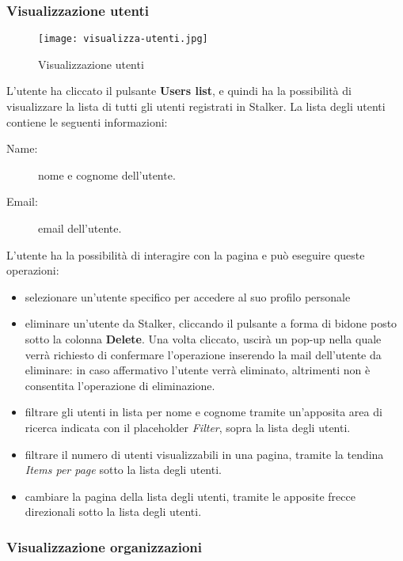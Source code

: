\documentclass[../manuale-utente.tex]{subfiles}
\begin{document}
\subsubsection{Visualizzazione utenti}%
\label{subs:visualizzazione_utenti}

\begin{figure}[H]
    \centering
    \texttt{[image: visualizza-utenti.jpg]} %
    \caption{Visualizzazione utenti}%
    \label{fig:web_app_visualizzazione_utenti}
\end{figure}
L'utente ha cliccato il pulsante \textbf{Users list}, e quindi ha la possibilità di visualizzare la lista di tutti gli utenti registrati in Stalker.
La lista degli utenti contiene le seguenti informazioni:
\begin{description}
  \item[Name:] nome e cognome dell'utente.
  \item[Email:] email dell'utente.
\end{description}
L'utente ha la possibilità di interagire con la pagina e può eseguire queste operazioni:
\begin{itemize}
  \item selezionare un'utente specifico per accedere al suo profilo personale %
  \item eliminare un'utente da Stalker, cliccando il pulsante a forma di bidone posto sotto la colonna \textbf{Delete}. Una volta cliccato, uscirà un pop-up nella quale verrà richiesto di confermare l'operazione inserendo la mail dell'utente da eliminare: in caso affermativo l'utente verrà eliminato, altrimenti non è consentita l'operazione di eliminazione. %
  \item filtrare gli utenti in lista per nome e cognome tramite un'apposita area di ricerca indicata con il placeholder \textit{Filter}, sopra la lista degli utenti.
  \item filtrare il numero di utenti visualizzabili in una pagina, tramite la tendina \textit{Items per page} sotto la lista degli utenti.
  \item cambiare la pagina della lista degli utenti, tramite le apposite frecce direzionali sotto la lista degli utenti.
\end{itemize}

\subsubsection{Visualizzazione organizzazioni}%
\label{subs:visualizzazione_organizzazioni}
\end{document}
